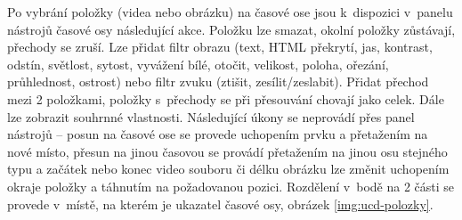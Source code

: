 Po vybrání položky (videa nebo obrázku) na časové ose jsou k~dispozici v~panelu nástrojů časové osy následující akce. Položku lze smazat, okolní položky zůstávají, přechody se zruší. Lze přidat filtr obrazu (text, HTML překrytí, jas, kontrast, odstín, světlost, sytost, vyvážení bílé, otočit, velikost, poloha, ořezání, průhlednost, ostrost) nebo filtr zvuku (ztišit, zesílit/zeslabit). Přidat přechod mezi 2 položkami, položky s~přechody se při přesouvání chovají jako celek. Dále lze zobrazit souhrnné vlastnosti. Následující úkony se neprovádí přes panel nástrojů -- posun na časové ose se provede uchopením prvku a přetažením na nové místo, přesun na jinou časovou se provádí přetažením na jinou osu stejného typu a začátek nebo konec video souboru či délku obrázku lze změnit uchopením okraje položky a táhnutím na požadovanou pozici. Rozdělení v~bodě na 2 části se provede v~místě, na kterém je ukazatel časové osy, obrázek \ref{img:ucd-polozky}.
